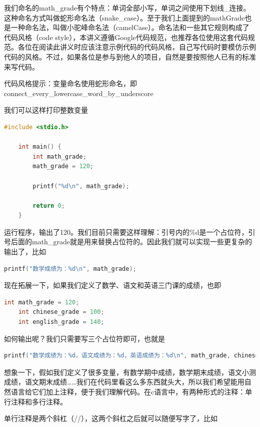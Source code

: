 我们命名的math\_grade有个特点：单词全部小写，单词之间使用下划线\_连接。这种命名方式叫做蛇形命名法（snake\_case）。至于我们上面提到的mathGrade也是一种命名法，叫做小驼峰命名法（camelCase）。命名法和一些其它规则构成了代码风格（code style），本讲义遵循Google代码规范，也推荐各位使用这套代码规范。各位在阅读此讲义时应该注意示例代码的代码风格，自己写代码时要模仿示例代码的风格。不过，如果各位是参与到他人的项目，自然是要按照他人已有的标准来写代码。

代码风格提示：变量命名使用蛇形命名，即connect\_every\_lowercase\_word\_by\_underscore

我们可以这样打印整数变量

\begin{lstlisting}[language=C]
    #include <stdio.h>

    int main() {
        int math_grade;
        math_grade = 120;

        printf("%d\n", math_grade); 

        return 0;
    }
\end{lstlisting}

运行程序，输出了120。我们目前只需要这样理解：引号内的\%d是一个占位符，引号后面的math\_grade就是用来替换占位符的。因此我们就可以实现一些更复杂的输出了，比如

\begin{lstlisting}[language=C]
    printf("数学成绩为：%d\n", math_grade); 
\end{lstlisting}

现在拓展一下，如果我们定义了数学、语文和英语三门课的成绩，也即

\begin{lstlisting}[language=C]
    int math_grade = 120;
    int chinese_grade = 100;
    int english_grade = 140;
\end{lstlisting}

如何输出呢？我们只需要写三个占位符即可，也就是

\begin{lstlisting}[language=C]
    printf("数学成绩为：%d，语文成绩为：%d，英语成绩为：%d\n", math_grade, chinese_grade, english_grade); 
\end{lstlisting}

想象一下，假如我们定义了很多变量，有数学期中成绩，数学期末成绩，语文小测成绩，语文期末成绩……我们在代码里看这么多东西就头大，所以我们希望能用自然语言给它们加上注释，便于我们理解代码。在c语言中，有两种形式的注释：单行注释和多行注释。

单行注释是两个斜杠（//），这两个斜杠之后就可以随便写字了，比如

